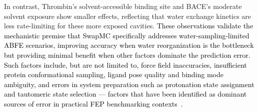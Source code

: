 \documentclass[journal=jacsat,manuscript=article]{achemso}
\newcommand*{\textblue}[1]{\textcolor{black}{#1}}
\begin{document}
In contrast, Thrombin's solvent-accessible binding site and BACE's moderate solvent exposure show smaller effects, 
reflecting that water exchange kinetics are less rate-limiting for these more exposed cavities. 
\textblue{
These observations validate the mechanistic premise that SwapMC specifically addresses water-sampling-limited ABFE scenarios, 
improving accuracy when water reorganization is the bottleneck but providing minimal benefit when other factors dominate the prediction error. 
Such factors include, but are not limited to, force field inaccuracies, 
insufficient protein conformational sampling, 
ligand pose quality and binding mode ambiguity, 
and errors in system preparation such as protonation state assignment 
and tautomeric state selection 
— factors that have been identified as dominant sources of error in practical FEP benchmarking contexts~\cite{Hahn_2024}.
}

\end{document}

